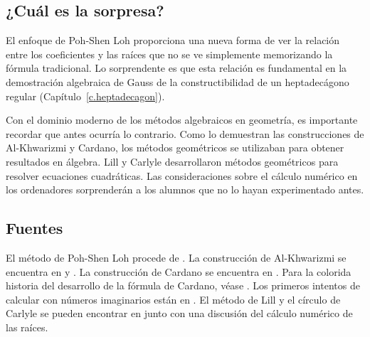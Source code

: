 \subsection*{¿Cuál es la sorpresa?}

El enfoque de Poh-Shen Loh proporciona una nueva forma de ver la relación entre los coeficientes y las raíces que no se ve simplemente memorizando la fórmula tradicional. Lo sorprendente es que esta relación es fundamental en la demostración algebraica de Gauss de la constructibilidad de un heptadecágono regular (Capítulo~\ref{c.heptadecagon}).

Con el dominio moderno de los métodos algebraicos en geometría, es importante recordar que antes ocurría lo contrario. Como lo demuestran las construcciones de Al-Khwarizmi y Cardano, los métodos geométricos se utilizaban para obtener resultados en álgebra. Lill y Carlyle desarrollaron métodos geométricos para resolver ecuaciones cuadráticas. Las consideraciones sobre el cálculo numérico en los ordenadores sorprenderán a los alumnos que no lo hayan experimentado antes.

\subsection*{Fuentes}

El método de Poh-Shen Loh procede de \cite{loh1,loh2}. La construcción de Al-Khwarizmi se encuentra en \cite[Capítulo~1]{jorg} y \cite{mastin}. La construcción de Cardano se encuentra en \cite[Capítulo~1]{jorg}. Para la colorida historia del desarrollo de la fórmula de Cardano, véase \cite{wiki:cardano}. Los primeros intentos de calcular con números imaginarios están en \cite[Capítulo~2]{jorg}. El método de Lill y el círculo de Carlyle se pueden encontrar en \cite{wiki:quadratic} junto con una discusión del cálculo numérico de las raíces.
